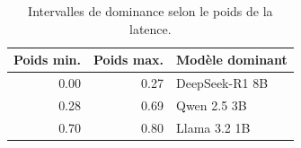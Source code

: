 \begin{table}[!htbp]
\centering
\caption{Intervalles de dominance selon le poids de la latence.}
\label{tab:llm_latency_weight_intervals}
\begin{tabular}{rrl}
\toprule
\textbf{Poids min.} & \textbf{Poids max.} & \textbf{Modèle dominant} \\
\midrule
0.00 & 0.27 & DeepSeek-R1 8B \\
0.28 & 0.69 & Qwen 2.5 3B \\
0.70 & 0.80 & Llama 3.2 1B \\
\bottomrule
\end{tabular}
\end{table}
